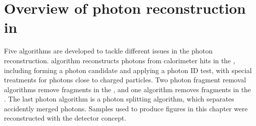 
\section{Overview of photon reconstruction in \pandora}



Five algorithms are developed to tackle different issues in the photon reconstruction. \PhotonReconstruction algorithm reconstructs photons from calorimeter hits in the \ECAL, including forming a photon candidate and applying a photon ID test, with special treatments for photons close to charged particles.  Two photon fragment removal algorithms remove fragments in the \ECAL, and one algorithm removes fragments in the \HCAL. The last photon algorithm is a photon splitting algorithm, which separates accidently merged photons. Samples used to produce figures in this chapter were reconstructed with the \ILD detector concept.




